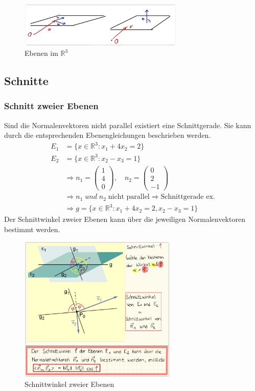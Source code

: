 \documentclass[12pt,a4paper]{article}%
\numberwithin{equation}{section}
\newcommand{\R}{\mathbb{R}} %
\def\vecT#1{\left(\begin{array}{c} #1 \end{array}\right)}
\numberwithin{equation}{subsection}
\begin{document}
    \begin{figure}[htbp] 
		  \centering
		  \includegraphics[width=0.7\textwidth]{Ebene_R3.png}
		  \caption{Ebenen im $\R^3$\protect\cite{HM12}}
		  \label{fig:ebene_R3}
	  \end{figure}
	  
	\subsection{Schnitte}
	  \subsubsection{Schnitt zweier Ebenen}
	  Sind die Normalenvektoren nicht parallel existiert eine Schnittgerade. Sie kann durch die entsprechenden Ebenengleichungen beschrieben werden.
	  \begin{align*}
	    E_1 &= \lbrace x\in \R^3:x_1 + 4x_2 = 2 \rbrace \\
	    E_2 &= \lbrace x \in \R^3: x_2 - x_3 = 1\rbrace \\
	    &\Rightarrow n_1 = \vecT{1\\4\\0},\quad n_2 = \vecT{0\\2\\-1} \\ 
	    &\Rightarrow n_1 \; und \; n_2 \;\text{nicht parallel} \Rightarrow \text{Schnittgerade ex.}\\
	    &\Rightarrow g=\lbrace x\in \R^3: x_1 + 4x_2 = 2, x_2 - x_3 = 1\rbrace
	  \end{align*}
	  Der Schnittwinkel zweier Ebenen kann über die jeweiligen Normalenvektoren bestimmt werden.
	  \begin{figure}[htbp] 
		  \centering
		  \includegraphics[width=0.67\textwidth]{schnitt_ebene.png}
		  \caption{Schnittwinkel zweier Ebenen\protect\cite{HM1Vortragsubung}}
		  \label{fig:ebene_schnittwinkel}
	  \end{figure} 
	  
\end{document}
